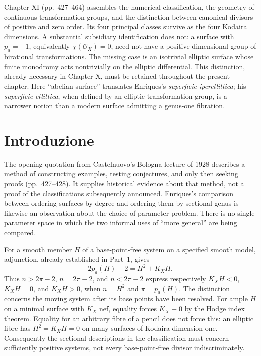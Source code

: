 Chapter XI (pp.~427--464) assembles the numerical classification, the geometry of continuous transformation groups, and the distinction between canonical divisors of positive and zero order. Its four principal classes survive as the four Kodaira dimensions. A substantial subsidiary identification does not: a surface with \(p_a=-1\), equivalently \(\chi(\mathcal O_X)=0\), need not have a positive-dimensional group of birational transformations. The missing case is an isotrivial elliptic surface whose finite monodromy acts nontrivially on the elliptic differential. This distinction, already necessary in Chapter X, must be retained throughout the present chapter. Here ``abelian surface'' translates Enriques's \emph{superficie iperellittica}; his \emph{superficie ellittica}, when defined by an elliptic transformation group, is a narrower notion than a modern surface admitting a genus-one fibration.

\section{Introduzione}
\label{cp2-xi-1}

The opening quotation from Castelnuovo's Bologna lecture of 1928 describes a method of constructing examples, testing conjectures, and only then seeking proofs (pp.~427--428). It supplies historical evidence about that method, not a proof of the classifications subsequently announced. Enriques's comparison between ordering surfaces by degree and ordering them by sectional genus is likewise an observation about the choice of parameter problem. There is no single parameter space in which the two informal uses of ``more general'' are being compared.

For a smooth member \(H\) of a base-point-free system on a specified smooth model, adjunction, already established in Part~1, gives
\[
2p_a(H)-2=H^2+K_XH.
\]
Thus \(n>2\pi-2\), \(n=2\pi-2\), and \(n<2\pi-2\) express respectively \(K_XH<0\), \(K_XH=0\), and \(K_XH>0\), when \(n=H^2\) and \(\pi=p_a(H)\). The distinction concerns the moving system after its base points have been resolved. For ample \(H\) on a minimal surface with \(K_X\) nef, equality forces \(K_X\equiv0\) by the Hodge index theorem. Equality for an arbitrary fibre of a pencil does not force this: an elliptic fibre has \(H^2=K_XH=0\) on many surfaces of Kodaira dimension one. Consequently the sectional descriptions in the classification must concern sufficiently positive systems, not every base-point-free divisor indiscriminately.

